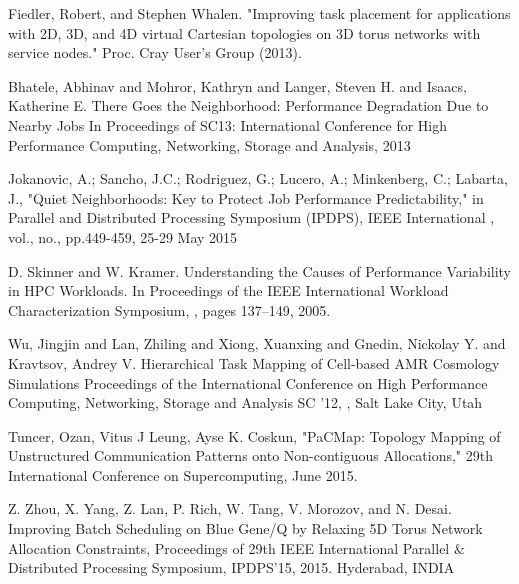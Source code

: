 \documentclass[conference]{IEEEtran}
\begin{document}
\begin{thebibliography}{10}

Fiedler, Robert, and Stephen Whalen. 
\newblock "Improving task placement for applications with 2D, 3D, and 4D virtual Cartesian topologies on 3D torus networks with service nodes." 
\newblock Proc. Cray User’s Group (2013).

Bhatele, Abhinav and Mohror, Kathryn and Langer, Steven
H. and Isaacs, Katherine E. 
\newblock There Goes the Neighborhood: Performance Degradation Due to Nearby Jobs 
\newblock In {Proceedings of SC13: International
Conference for High Performance Computing, Networking, Storage and Analysis},
2013

Jokanovic, A.; Sancho, J.C.; Rodriguez, G.; Lucero, A.; Minkenberg, C.; Labarta, J.,
\newblock "Quiet Neighborhoods: Key to Protect Job Performance Predictability," 
\newblock in Parallel and Distributed Processing Symposium (IPDPS), 
 IEEE International , vol., no., pp.449-459, 25-29 May 2015

D. Skinner and W. Kramer. 
\newblock Understanding the Causes of Performance Variability in HPC Workloads. 
\newblock In Proceedings of the IEEE International Workload Characterization Symposium, 
, pages 137–149, 2005.


Wu, Jingjin and Lan, Zhiling and Xiong, Xuanxing and Gnedin, Nickolay Y. and Kravtsov, Andrey V.
\newblock Hierarchical Task Mapping of Cell-based AMR Cosmology Simulations
\newblock Proceedings of the International Conference on High Performance Computing, Networking, Storage and Analysis
\newblock SC '12,
,
\newblock Salt Lake City, Utah

Tuncer, Ozan, Vitus J Leung, Ayse K. Coskun,
\newblock "PaCMap: Topology Mapping of Unstructured Communication Patterns onto Non-contiguous Allocations," 
\newblock 29th International Conference on Supercomputing, June 2015.


Z. Zhou, X. Yang, Z. Lan, P. Rich, W. Tang, V. Morozov, and N. Desai.
\newblock Improving Batch Scheduling on Blue Gene/Q by Relaxing 5D Torus Network Allocation Constraints,
\newblock Proceedings of 29th IEEE International Parallel \& Distributed Processing 
Symposium,
\newblock IPDPS'15, 2015.
\newblock Hyderabad, INDIA


\end{thebibliography}
\end{document}

